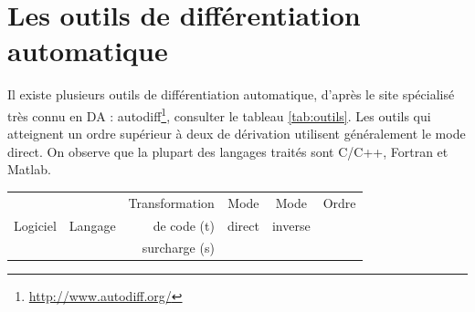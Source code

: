\section{Les outils de diff\'erentiation automatique}
Il existe plusieurs outils de diff\'erentiation automatique, d'apr\`es le site sp\'ecialis\'e tr\`es connu en DA :
 autodiff\footnote{\url{http://www.autodiff.org/}}, consulter le tableau \ref{tab:outils}. Les outils qui atteignent un ordre sup\'erieur \`a deux de d\'erivation 
utilisent g\'en\'eralement le mode direct. On observe que la plupart des langages trait\'es sont
C/C++, Fortran et Matlab.


\begin{table}[H]
	\begin{center}
{
\scriptsize
\begin{tabular}{ | l | c | r | c | c | c | } \hline

           &         & Transformation            & Mode   & Mode      & Ordre  \\
  Logiciel & Langage & de code (t)               & direct &  inverse  &        \\
           &         & surcharge (s)             &        &           &        \\


\end{tabular}}
\end{center}
\end{table}
